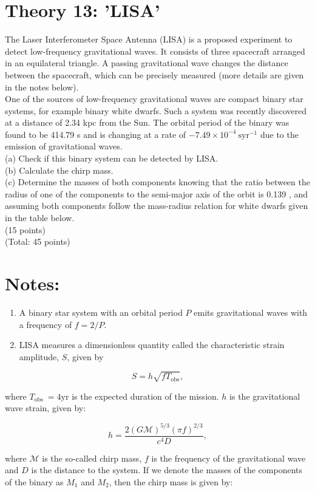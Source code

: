 \documentclass[10pt]{article}
\begin{document}
\section*{Theory 13: 'LISA'}
The Laser Interferometer Space Antenna (LISA) is a proposed experiment to detect low-frequency gravitational waves. It consists of three spacecraft arranged in an equilateral triangle. A passing gravitational wave changes the distance between the spacecraft, which can be precisely measured (more details are given in the notes below).\\
One of the sources of low-frequency gravitational waves are compact binary star systems, for example binary white dwarfs. Such a system was recently discovered at a distance of 2.34 kpc from the Sun. The orbital period of the binary was found to be 414.79 s and is changing at a rate of $-7.49 \times 10^{-4} \mathrm{~s} \mathrm{yr}^{-1}$ due to the emission of gravitational waves.\\
(a) Check if this binary system can be detected by LISA.\\
(b) Calculate the chirp mass.\\
(c) Determine the masses of both components knowing that the ratio between the radius of one of the components to the semi-major axis of the orbit is 0.139 , and assuming both components follow the mass-radius relation for white dwarfs given in the table below.\\
(15 points)\\
(Total: 45 points)

\section*{Notes:}
\begin{enumerate}
  \item A binary star system with an orbital period $P$ emits gravitational waves with a frequency of $f=2 / P$.
  \item LISA measures a dimensionless quantity called the characteristic strain amplitude, $S$, given by
\end{enumerate}

$$
S=h \sqrt{f T_{\mathrm{obs}}},
$$

where $T_{\text {obs }}=4 \mathrm{yr}$ is the expected duration of the mission. $h$ is the gravitational wave strain, given by:

$$
h=\frac{2(G \mathcal{M})^{5 / 3}(\pi f)^{2 / 3}}{c^{4} D},
$$

where $\mathcal{M}$ is the so-called chirp mass, $f$ is the frequency of the gravitational wave and $D$ is the distance to the system. If we denote the masses of the components of the binary as $M_{1}$ and $M_{2}$, then the chirp mass is given by:
\end{document}
